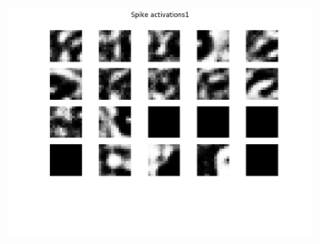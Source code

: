 \begin{figure}
\begin{subfigure}[t]{.24\textwidth}
  		\label{fig:sub2}
	\end{subfigure}
	\begin{subfigure}[t]{.24\textwidth}
  		\centering
  		\includegraphics[width=.9\linewidth]{imgs/convert/cuba00001.png}
  		\label{fig:sub2}
	\end{subfigure}	


\end{figure}
